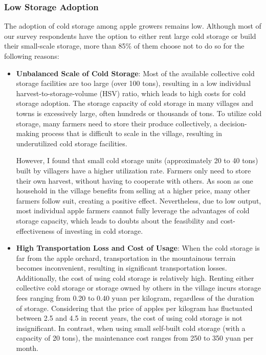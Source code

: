 \documentclass[12pt]{article}
\begin{document}
\subsubsection{Low Storage Adoption}
\noindent The adoption of cold storage among apple growers remains low. Although most of our survey respondents have the option to either rent large cold storage or build their small-scale storage, more than 85\% of them choose not to do so for the following reasons:
\begin{itemize}
    \item \textbf{Unbalanced Scale of Cold Storage}: Most of the available collective cold storage facilities are too large (over 100 tons), resulting in a low individual harvest-to-storage-volume (HSV) ratio, which leads to high costs for cold storage adoption. The storage capacity of cold storage in many villages and towns is excessively large, often hundreds or thousands of tons. To utilize cold storage, many farmers need to store their produce collectively, a decision-making process that is difficult to scale in the village, resulting in underutilized cold storage facilities. 
    
    However, I found that small cold storage units (approximately 20 to 40 tons) built by villagers have a higher utilization rate. Farmers only need to store their own harvest, without having to cooperate with others. As soon as one household in the village benefits from selling at a higher price, many other farmers follow suit, creating a positive effect. Nevertheless, due to low output, most individual apple farmers cannot fully leverage the advantages of cold storage capacity, which leads to doubts about the feasibility and cost-effectiveness of investing in cold storage.

    \item \textbf{High Transportation Loss and Cost of Usage}: When the cold storage is far from the apple orchard, transportation in the mountainous terrain becomes inconvenient, resulting in significant transportation losses. Additionally, the cost of using cold storage is relatively high. Renting either collective cold storage or storage owned by others in the village incurs storage fees ranging from 0.20 to 0.40 yuan per kilogram, regardless of the duration of storage. Considering that the price of apples per kilogram has fluctuated between 2.5 and 4.5 in recent years, the cost of using cold storage is not insignificant. In contrast, when using small self-built cold storage (with a capacity of 20 tons), the maintenance cost ranges from 250 to 350 yuan per month.
    

\end{itemize}
\end{document}
